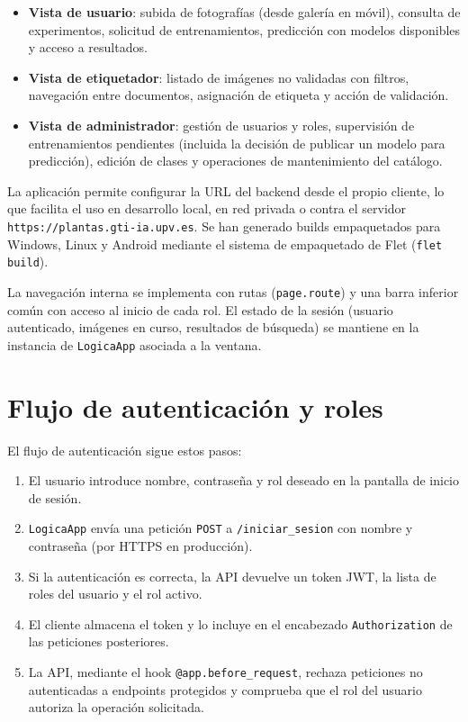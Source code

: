 \documentclass[11pt,spanish,listoffigures,listoftables]{tfgetsinf}
\begin{document}
\begin{itemize}
    \item \textbf{Vista de usuario}: subida de fotografías (desde galería en móvil), consulta de experimentos, solicitud de entrenamientos, predicción con modelos disponibles y acceso a resultados.
    \item \textbf{Vista de etiquetador}: listado de imágenes no validadas con filtros, navegación entre documentos, asignación de etiqueta y acción de validación.
    \item \textbf{Vista de administrador}: gestión de usuarios y roles, supervisión de entrenamientos pendientes (incluida la decisión de publicar un modelo para predicción), edición de clases y operaciones de mantenimiento del catálogo.
\end{itemize}

La aplicación permite configurar la URL del backend desde el propio cliente, lo que facilita el uso en desarrollo local, en red privada o contra el servidor \texttt{https://plantas.gti-ia.upv.es}. Se han generado builds empaquetados para Windows, Linux y Android mediante el sistema de empaquetado de Flet (\texttt{flet build}).

La navegación interna se implementa con rutas (\texttt{page.route}) y una barra inferior común con acceso al inicio de cada rol. El estado de la sesión (usuario autenticado, imágenes en curso, resultados de búsqueda) se mantiene en la instancia de \texttt{LogicaApp} asociada a la ventana.

\section{Flujo de autenticación y roles}

El flujo de autenticación sigue estos pasos:

\begin{enumerate}
    \item El usuario introduce nombre, contraseña y rol deseado en la pantalla de inicio de sesión.
    \item \texttt{LogicaApp} envía una petición \texttt{POST} a \texttt{/iniciar\_sesion} con nombre y contraseña (por HTTPS en producción).
    \item Si la autenticación es correcta, la API devuelve un token JWT, la lista de roles del usuario y el rol activo.
    \item El cliente almacena el token y lo incluye en el encabezado \texttt{Authorization} de las peticiones posteriores.
    \item La API, mediante el hook \texttt{@app.before\_request}, rechaza peticiones no autenticadas a endpoints protegidos y comprueba que el rol del usuario autoriza la operación solicitada.
\end{enumerate}
\end{document}
